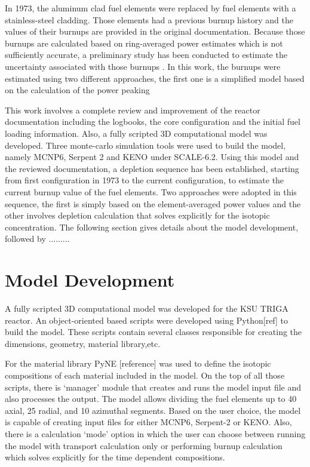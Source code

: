 \documentclass[review]{elsarticle}
\begin{document}
In 1973, the aluminum clad fuel elements  were replaced by fuel elements with a stainless-steel cladding. Those elements had a previous burnup history and the values of their burnups are provided in the original documentation. 
Because those burnups are calculated based on ring-averaged power estimates which is not sufficiently accurate, a preliminary study has been conducted to estimate the uncertainty associated with those burnups \cite{gairola2017estimating}.
In this work, the burnups were estimated using two different approaches, the first one is a simplified model based on the calculation of the power peaking 

This work involves a complete review and improvement of the reactor documentation including the logbooks, the core configuration and the initial fuel loading information.
Also, a fully scripted 3D computational model was developed. Three monte-carlo simulation tools were used to build the model, namely MCNP6, Serpent 2 and KENO under SCALE-6.2.
Using this model and the reviewed documentation, a depletion sequence has been established, starting from first configuration in 1973 to the current configuration, to estimate the current burnup value of the fuel elements. Two approaches were adopted in this sequence, the first is simply based on the element-averaged power values and the other involves depletion calculation that solves explicitly for the isotopic concentration.
The following section gives details about the model development, followed by .........


\section{Model Development}
 
 A fully scripted 3D computational model was developed for the KSU TRIGA reactor. An object-oriented based scripts were developed using Python[ref] to build the model. These scripts contain several classes responsible for creating the dimensions, geometry, material library,etc. 
 
 For the material library PyNE [reference] was used to define the isotopic compositions of each material included in the model.
 On the top of all those scripts, there is `manager' module that creates and runs the model input file and also processes the output. 
 The model allows dividing the fuel elements up to 40 axial, 25 radial, and 10 azimuthal segments.
 Based on the user choice, the model is capable of creating input files for either MCNP6, Serpent-2 or KENO. Also, there is a calculation `mode' option in which the user can choose between running the model with transport calculation only or performing burnup calculation which solves explicitly for the time dependent compositions.
 
\end{document}

